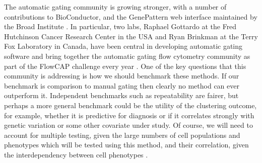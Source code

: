 The automatic gating community is growing stronger, with a number of contributions to BioConductor, and the GenePattern web interface maintained by the Broad Institute \citep{Kvistborg:2015}.
In particular, two labs, Raphael Gottardo at the Fred Hutchinson Cancer Research Center in the USA and Ryan Brinkman at the Terry Fox Laboratory in Canada, have been central in developing automatic gating software and bring together the automatic gating flow cytometry community as part of the FlowCAP challenge every year \citep{Aghaeepour:2013dg}.
One of the key questions that this community is addressing is how we should benchmark these methods.
If our benchmark is comparison to manual gating then clearly no method can ever outperform it.
Independent benchmarks such as repeatability are fairer, but perhaps a more general benchmark could be the utility of the clustering outcome, for example, whether it is predictive for diagnosis or if it correlates strongly with genetic variation or some other covariate under study.
Of course, we will need to account for multiple testing, given the large numbers of cell populations and phenotypes which will be tested using this method, and their correlation, given the interdependency between cell phenotypes \citep{Roederer:2015eu}.


